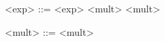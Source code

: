 \begin{grammarEx}
	<exp> ::= <exp> \lit{+} <mult>
	\alt <mult>
	
	<mult> ::= <mult> \lit{*} 
	\alt {}
\end{grammarEx}